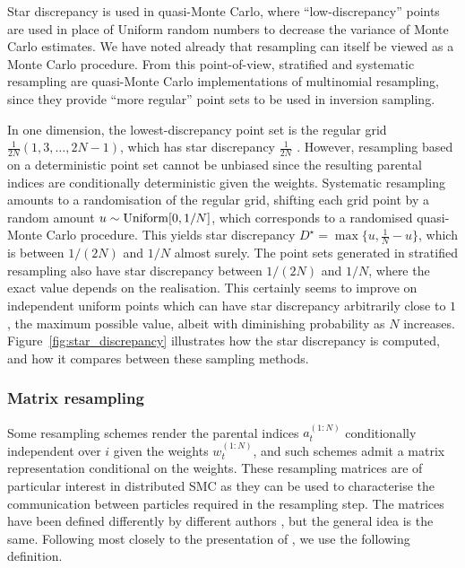 Star discrepancy is used in quasi-Monte Carlo, where ``low-discrepancy'' points are used in place of Uniform random numbers to decrease the variance of Monte Carlo estimates.
We have noted already that resampling can itself be viewed as a Monte Carlo procedure.
From this point-of-view, stratified and systematic resampling are quasi-Monte Carlo implementations of multinomial resampling, since they provide ``more regular'' point sets to be used in inversion sampling.

In one dimension, the lowest-discrepancy point set is the regular grid $\frac{1}{2N}(1, 3, \dots, 2N-1)$, which has star discrepancy $\frac{1}{2N}$ \parencite[see for example][Corollary 1.2]{kuipers1974}.
However, resampling based on a deterministic point set cannot be unbiased since the resulting parental indices are conditionally deterministic given the weights.
Systematic resampling amounts to a randomisation of the regular grid, shifting each grid point by a random amount $u \sim \operatorname{Uniform}[0,1/N]$, which corresponds to a randomised quasi-Monte Carlo procedure. This yields star discrepancy $D^\star = \max\{u, \frac{1}{N} -u\}$, which is between $1/(2N)$ and $1/N$ almost surely.
The point sets generated in stratified resampling also have star discrepancy between $1/(2N)$ and $1/N$, where the exact value depends on the realisation.
This certainly seems to improve on independent uniform points which can have star discrepancy arbitrarily close to $1$, the maximum possible value, albeit with diminishing probability as $N$ increases.
Figure~\ref{fig:star_discrepancy} illustrates how the star discrepancy is computed, and how it compares between these sampling methods.



\subsubsection{Matrix resampling}
Some resampling schemes render the parental indices $a_t^{(1:N)}$ conditionally independent over $i$ given the weights $w_t^{(1:N)}$, and such schemes admit a matrix representation conditional on the weights.
These resampling matrices are of particular interest in distributed SMC as they can be used to characterise the communication between particles required in the resampling step.
The matrices have been defined differently by different authors \parencite[cf.][]{webber2019, whiteley2016}, but the general idea is the same. Following most closely to the presentation of \textcite{li2020}, we use the following definition.

